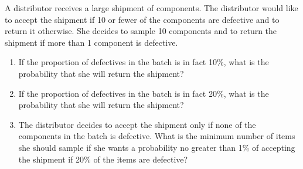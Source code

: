 \documentclass[11pt]{article}
\theoremstyle{mystyle}
\newtheorem{pproblem}{Problem}
\begin{document}
\begin{psproblem}{}{}
    A distributor receives a large shipment of components. The distributor would like to accept the shipment if 10
    or fewer of the components are defective and to return it otherwise. She decides to sample 10 components and to
    return the shipment if more than 1 component is defective.
    \begin{enumerate}[label=\alph*.]
        \item If the proportion of defectives in the batch is in fact 10\%, what is the probability that she will return the
        shipment?
        \item If the proportion of defectives in the batch is in fact 20\%, what is the probability that she will return the
        shipment?
        \item The distributor decides to accept the shipment only if none of the components in the batch is defective. What
        is the minimum number of items she should sample if she wants a probability no greater than 1\% of accepting
        the shipment if 20\% of the items are defective?
    \end{enumerate}
\end{psproblem}





%
%
\end{document}
